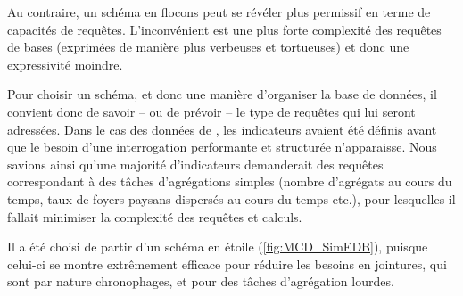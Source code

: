 Au contraire, un schéma \og en flocons\fg{} \autocite{noauthor_snowflake_2018} peut se révéler plus permissif en terme de capacités de requêtes.
L'inconvénient est une plus forte complexité des requêtes de bases (exprimées de manière plus verbeuses et tortueuses) et donc une expressivité moindre.

Pour choisir un schéma, et donc une manière d'organiser la base de données, il convient donc de savoir -- ou de prévoir -- le type de requêtes qui lui seront adressées.
Dans le cas des données de \simfeodal{}, les indicateurs avaient été définis avant que le besoin d'une interrogation performante et structurée n'apparaisse.
Nous savions ainsi qu'une majorité d'indicateurs demanderait des requêtes correspondant à des tâches d'agrégations simples (nombre d'agrégats au cours du temps, taux de foyers paysans dispersés au cours du temps etc.), pour lesquelles il fallait minimiser la complexité des requêtes et calculs.

Il a été choisi de partir d'un schéma en étoile (\cref{fig:MCD_SimEDB}), puisque celui-ci se montre extrêmement efficace pour réduire les besoins en jointures, qui sont par nature chronophages, et pour des tâches d'agrégation lourdes.

